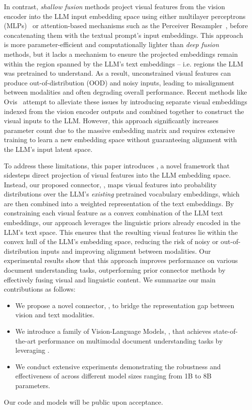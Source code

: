 In contrast, \emph{shallow fusion} methods project visual features from the vision encoder into the LLM input embedding space using either multilayer perceptrons (MLPs)~\citep{liu2023llava, liu2024llavanext} or attention-based mechanisms such as the Perceiver Resampler~\citep{blip2, idefics2, flamingo}, before concatenating them with the textual prompt's input embeddings. This approach is more parameter-efficient and computationally lighter than \emph{deep fusion} methods, but it lacks a mechanism to ensure the projected embeddings remain within the region spanned by the LLM's text embeddings -- i.e. regions the LLM was pretrained to understand.
As a result, unconstrained visual features
can produce out-of-distribution (OOD) and noisy inputs, leading to misalignment between modalities and often degrading overall performance. Recent methods like Ovis~\citep{ovis} attempt to alleviate these issues by introducing separate visual embeddings 
indexed from the vision encoder outputs and combined together 
to construct the visual inputs to the LLM. However, this approach significantly increases parameter count due to the massive embedding matrix and requires extensive training to learn a new embedding space without guaranteeing alignment with the LLM's input latent space.


To address these limitations, this paper introduces \textbf{\ourmodel{}}, a novel framework that sidesteps direct projection of visual features into the LLM embedding space. Instead, our proposed connector, \alignmodule, maps visual features into probability distributions over the LLM's \emph{existing} pretrained vocabulary embeddings, which are 
then combined into a weighted representation of the text embeddings.
By constraining each visual feature as a convex combination of the LLM text embeddings, our approach leverages the linguistic priors already encoded in the LLM's text space. This ensures that the resulting visual features lie within the convex hull of the LLM's embedding space, reducing the risk of noisy or out-of-distribution inputs and improving alignment between modalities.
Our experimental results show that this approach improves performance on various document understanding tasks, outperforming prior connector methods by effectively fusing visual and linguistic content. We summarize our main contributions as follows:
\vspace{-0.3cm}
\begin{itemize} 
\setlength{\itemsep}{0pt}
    \item We propose a novel connector, \textbf{\alignmodule}, to bridge the representation gap between vision and text modalities.
    \item We introduce a family of Vision-Language Models, \textbf{\ourmodel{}}, that achieves state-of-the-art performance on multimodal document understanding tasks by leveraging \alignmodule.
    \item We conduct extensive experiments %
    demonstrating the robustness and effectiveness of \textbf{\alignmodule} across different model sizes ranging from 1B to 8B parameters.
    \vspace{-0.3cm}
\end{itemize}
Our code and models will be public upon acceptance. %
